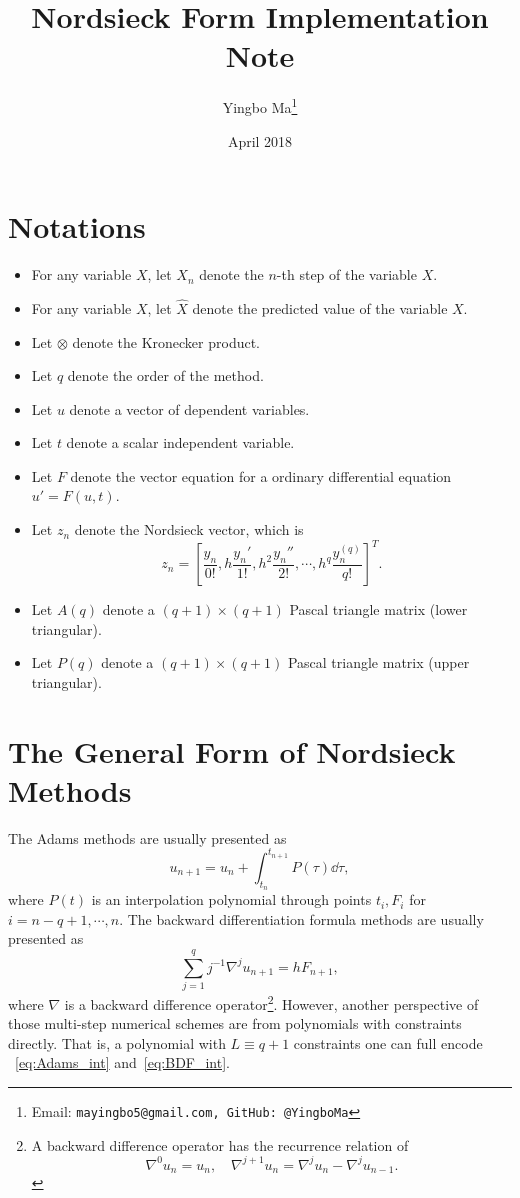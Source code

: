 \documentclass[11pt,a4paper]{article}
\title{Nordsieck Form Implementation Note}
\author{Yingbo Ma\thanks{Email: \tt{mayingbo5@gmail.com},
                         GitHub: \tt{@YingboMa}}}
\date{April 2018}
\begin{document}
\maketitle

\section*{Notations}
\begin{multicols}{2}
  \begin{itemize}
    \item For any variable $X$, let $X_n$ denote the $n$-th step of the variable $X$.
    \item For any variable $X$, let $\hat{X}$ denote the predicted value of the variable $X$.
    \item Let $\otimes$ denote the Kronecker product.
    \item Let $q$ denote the order of the method.
    \item Let $u$ denote a vector of dependent variables.
    \item Let $t$ denote a scalar independent variable.
    \columnbreak
    \item Let $F$ denote the vector equation for a ordinary differential equation
      $u' = F(u, t)$.
    \item Let $z_n$ denote the Nordsieck vector, which is
      \[
        z_n = \left[\frac{y_n}{0!}, h\frac{y_n'}{1!}, h^2\frac{y_n''}{2!},
        \cdots, h^q\frac{y_n^{(q)}}{q!}\right]^T.
      \]
    \item Let $A(q)$ denote a $(q+1)\times (q+1)$ Pascal triangle matrix (lower
      triangular).
    \item Let $P(q)$ denote a $(q+1)\times (q+1)$ Pascal triangle matrix (upper
      triangular).
  \end{itemize}
\end{multicols}

\section{The General Form of Nordsieck Methods}
The Adams methods are usually presented as
\begin{equation}\label{eq:Adams_int}
  u_{n+1} = u_n + \int_{t_n}^{t_{n+1}} P(\tau) \dd{\tau},
\end{equation}
where $P(t)$ is an interpolation polynomial through points $t_i, F_i$ for
$i=n-q+1,\cdots,n$. The backward differentiation formula methods are usually
presented as
\begin{equation}\label{eq:BDF_int}
  \sum_{j=1}^q j^{-1}\nabla^ju_{n+1} = hF_{n+1},
\end{equation}
where $\nabla$ is a backward difference operator\footnote{A backward
difference operator has the recurrence relation of
\[
  \nabla^0u_n = u_n,\quad \nabla^{j+1}u_n = \nabla^ju_n-\nabla^ju_{n-1}.
\]}.
However, another perspective of those multi-step numerical schemes are from
polynomials with constraints directly. That is, a polynomial with $L\equiv q+1$
constraints one can full encode ~\cref{eq:Adams_int} and~\cref{eq:BDF_int}.
\end{document}
